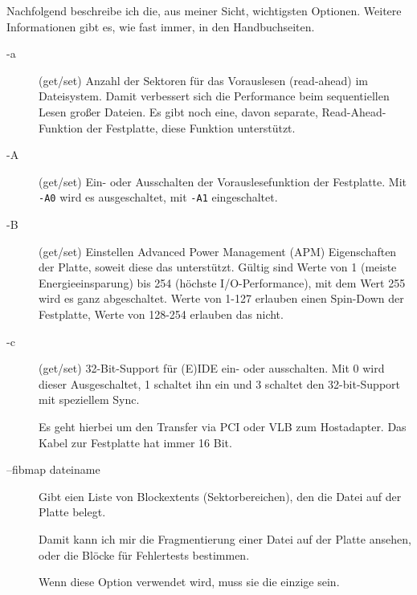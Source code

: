 \begin{normaltext}
  Nachfolgend beschreibe ich die, aus meiner Sicht, wichtigsten Optionen.
  Weitere Informationen gibt es, wie fast immer, in den Handbuchseiten.
  \begin{description}
    \item[-a] (get/set) Anzahl der Sektoren für das Vorauslesen (read-ahead)
      im Dateisystem. Damit verbessert sich die Performance beim sequentiellen
      Lesen großer Dateien. Es gibt noch eine, davon separate,
      Read-Ahead-Funktion der Festplatte, diese Funktion unterstützt.
    \item[-A] (get/set) Ein- oder Ausschalten der Vorauslesefunktion der
      Festplatte. Mit \verb?-A0? wird es ausgeschaltet, mit \verb?-A1?
      eingeschaltet.
    \item[-B] (get/set) Einstellen Advanced Power Management (APM)
      Eigenschaften der Platte, soweit diese das unterstützt. Gültig sind
      Werte von 1 (meiste Energieeinsparung) bis 254 (höchste
      I/O-Performance), mit dem Wert 255 wird es ganz abgeschaltet. Werte von
      1-127 erlauben einen Spin-Down der Festplatte, Werte von 128-254
      erlauben das nicht.
    \item[-c] (get/set) 32-Bit-Support für (E)IDE ein- oder ausschalten.
      Mit 0 wird dieser Ausgeschaltet, 1 schaltet ihn ein und 3 schaltet den
      32-bit-Support mit speziellem Sync.

      Es geht hierbei um den Transfer via PCI oder VLB zum Hostadapter. Das
      Kabel zur Festplatte hat immer 16 Bit.
    \item[--fibmap dateiname] Gibt eien Liste von Blockextents
      (Sektorbereichen), den die Datei auf der Platte belegt.

      Damit kann ich mir die Fragmentierung einer Datei auf der Platte
      ansehen, oder die Blöcke für Fehlertests bestimmen.

      Wenn diese Option verwendet wird, muss sie die einzige sein.
  \end{description}
\end{normaltext}

